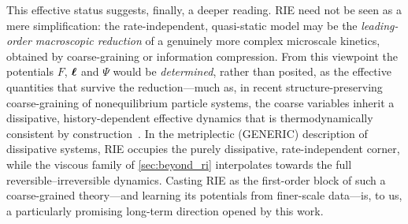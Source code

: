 This effective status suggests, finally, a deeper reading. RIE need not
be seen as a mere simplification: the rate-independent, quasi-static
model may be the \emph{leading-order macroscopic reduction} of a
genuinely more complex microscale kinetics, obtained by coarse-graining
or information compression. From this viewpoint the potentials $F$,
$\bm{\ell}$ and $\Psi$ would be \emph{determined}, rather than posited, as
the effective quantities that survive the reduction---much as, in recent
structure-preserving coarse-graining of nonequilibrium particle systems,
the coarse variables inherit a dissipative, history-dependent effective
dynamics that is thermodynamically consistent by
construction~\cite{Hernandez2026}. In the metriplectic (GENERIC)
description of dissipative systems, RIE occupies the purely dissipative,
rate-independent corner, while the viscous family of
\cref{sec:beyond_ri} interpolates towards the full
reversible--irreversible dynamics. Casting RIE as the first-order block
of such a coarse-grained theory---and learning its potentials from
finer-scale data---is, to us, a particularly promising long-term
direction opened by this work.
